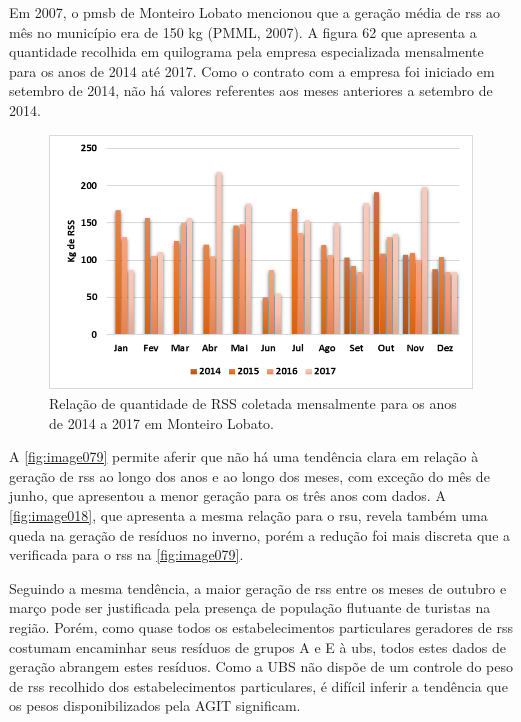 	
	Em 2007, o \gls{pmsb} de Monteiro Lobato mencionou que a geração média de \gls{rss} ao mês no município era de 150 kg (PMML, 2007). A figura 62 que apresenta a quantidade recolhida em quilograma pela empresa especializada mensalmente para os anos de 2014 até 2017. Como o contrato com a empresa foi iniciado em setembro de 2014, não há valores referentes aos meses anteriores a setembro de 2014.
	
	
	\begin{figure}
		\centering
		\includegraphics[width=0.75\linewidth]{produtos/prodtres/image079}
		\caption{Relação de quantidade de RSS coletada mensalmente para os anos de 2014 a 2017 em Monteiro Lobato.}
		\label{fig:image079}
	\end{figure}
	
	
	A \autoref{fig:image079} permite aferir que não há uma tendência clara em relação à geração de \gls{rss} ao longo dos anos e ao longo dos meses, com exceção do mês de junho, que apresentou a menor geração para os três anos com dados. A \autoref{fig:image018}, que apresenta a mesma relação para o \gls{rsu}, revela também uma queda na geração de resíduos no inverno, porém a redução foi mais discreta que a verificada para o \gls{rss} na \autoref{fig:image079}.
	
	Seguindo a mesma tendência, a maior geração de \gls{rss} entre os meses de outubro e março pode ser justificada pela presença de população flutuante de turistas na região. Porém, como quase todos os estabelecimentos particulares geradores de \gls{rss} costumam encaminhar seus resíduos de grupos A e E à \gls{ubs}, todos estes dados de geração abrangem estes resíduos. Como a UBS não dispõe de um controle do peso de \gls{rss} recolhido dos estabelecimentos particulares, é difícil inferir a tendência que os pesos disponibilizados pela AGIT significam.
	
